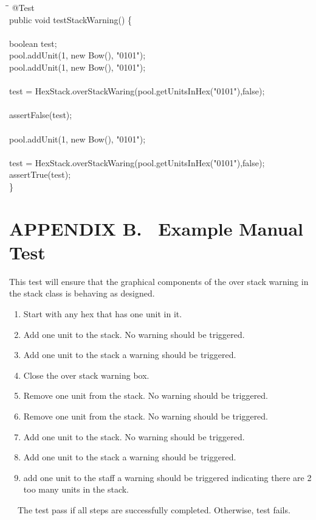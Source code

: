 {{\color{black}

\begin{tabbing}
\hspace*{1cm}\=\hspace*{0cm}\= \kill
    @Test\\
    public void testStackWarning() \{\\
        \\
        \>boolean test;\\
        \>pool.addUnit(1, new Bow(), "0101");\\
        \>pool.addUnit(1, new Bow(), "0101");\\
        \\
        \>test = HexStack.overStackWaring(pool.getUnitsInHex("0101"),false);\\
        \\
        \>assertFalse(test);\\
        \\
        \>pool.addUnit(1, new Bow(), "0101");\\
        \\
        \>test = HexStack.overStackWaring(pool.getUnitsInHex("0101"),false);\\
        \>assertTrue(test);\\
    \}\\
    \end{tabbing}  
}

\clearpage\setcounter{page}{1}\pagestyle{Convertviii}
\section[APPENDIX B. \ [Example Manual Test{]}]{\bfseries\color{black} APPENDIX B.
\ Example Manual Test}
This test will ensure that the graphical components of the over stack warning in the stack class is behaving as designed.\

\begin{enumerate}
\item Start with any hex that has one unit in it.
\item Add one unit to the stack. No warning should be triggered.
\item Add one unit to the stack a warning should be triggered.
\item Close the over stack warning box.
\item Remove one unit from the stack. No warning should be triggered.
\item Remove one unit from the stack. No warning should be triggered.
\item Add one unit to the stack. No warning should be triggered.
\item Add one unit to the stack a warning should be triggered.
\item add one unit to the staff a warning should be triggered indicating there are 2 too many units in the stack.
\end{enumerate}
\
\
The test pass if all steps are successfully completed. Otherwise, test fails.

}
